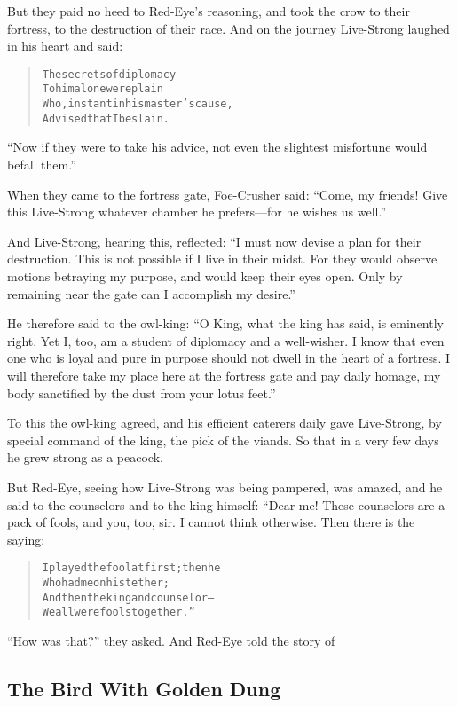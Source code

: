 \documentclass[article, twoside, 14pt]{memoir}
\renewenvironment{verbatim}{%
\begin{quote}%
\vskip -10pt%
\begin{alltt}\normalfont\large}{\end{alltt}%
\end{quote}%
\vskip -10pt
} %
\begin{document}
But they paid no heed to Red-Eye's reasoning, and took the crow to
their fortress, to the destruction of their race. And on the
journey Live-Strong laughed in his heart and said:

\begin{verbatim}
The secrets of diplomacy
    To him alone were plain
Who, instant in his master's cause,
    Advised that I be slain.
\end{verbatim}
``Now if they were to take his advice, not even the slightest misfortune would befall them.''

When they came to the fortress gate, Foe-Crusher said:
``Come, my friends! Give this Live-Strong whatever chamber he prefers---for he wishes us well.''

And Live-Strong, hearing this, reflected:
``I must now devise a plan for their destruction. This is not possible if I live in their midst. For they would observe motions betraying my purpose, and would keep their eyes open. Only by remaining near the gate can I accomplish my desire.''

He therefore said to the owl-king:
``O King, what the king has said, is eminently right. Yet I, too, am a student of diplomacy and a well-wisher. I know that even one who is loyal and pure in purpose should not dwell in the heart of a fortress. I will therefore take my place here at the fortress gate and pay daily homage, my body sanctified by the dust from your lotus feet.''

To this the owl-king agreed, and his efficient caterers daily gave
Live-Strong, by special command of the king, the pick of the
viands. So that in a very few days he grew strong as a peacock.

But Red-Eye, seeing how Live-Strong was being pampered, was amazed,
and he said to the counselors and to the king himself: “Dear me!
These counselors are a pack of fools, and you, too, sir. I cannot
think otherwise. Then there is the saying:

\begin{verbatim}
I played the fool at first; then he
    Who had me on his tether;
And then the king and counselor--
    We all were fools together.”
\end{verbatim}
``How was that?'' they asked. And Red-Eye told the story of

\subsection{The Bird With Golden Dung}
\end{document}

